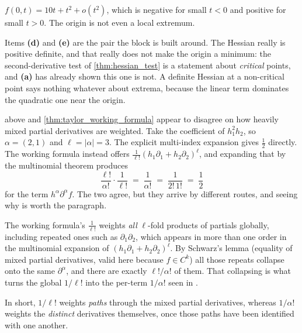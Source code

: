 \begin{example}
\begin{enumerate}[label=\textbf{(\alph*)}]
    $f(0,t) = 10t + t^2 + o(t^2)$, which is negative for small $t < 0$ and positive for small
    $t > 0$. The origin is not even a local extremum.
\end{enumerate}
Items \textbf{(d)} and \textbf{(e)} are the pair the block is built around. The Hessian really is
positive definite, and that really does not make the origin a minimum: the second-derivative test
of \cref{thm:hessian_test} is a statement about \emph{critical} points, and \textbf{(a)} has
already shown this one is not. A definite Hessian at a non-critical point says nothing whatever
about extrema, because the linear term dominates the quadratic one near the origin.
\end{example}

\begin{remark}
 above and \cref{thm:taylor_working_formula} appear to disagree
on how heavily mixed partial derivatives are weighted. Take the coefficient of $h_1^2h_2$, so
$\alpha = (2,1)$ and $\ell = |\alpha| = 3$. The explicit multi-index expansion gives $\tfrac12$
directly. The working formula instead offers $\tfrac{1}{\ell!}(h_1\partial_1+h_2\partial_2)^\ell$,
and expanding that by the multinomial theorem produces
\[
  \frac{\ell!}{\alpha!}\cdot\frac{1}{\ell!} \;=\; \frac{1}{\alpha!}
  \;=\; \frac{1}{2!\,1!} \;=\; \frac12
\]
for the term $h^\alpha\partial^\alpha f$. The two agree, but they arrive by different routes, and
seeing why is worth the paragraph.

The working formula's $\tfrac{1}{\ell!}$ weights \emph{all} $\ell$-fold products of partials
globally, including repeated ones such as $\partial_1\partial_2$, which appears in more than one
order in the multinomial expansion of $(h_1\partial_1+h_2\partial_2)^\ell$. By Schwarz's lemma
(equality of mixed partial derivatives, valid here because $f \in C^k$) all those repeats collapse
onto the same $\partial^\alpha$, and there are exactly $\ell!/\alpha!$ of them. That collapsing is
what turns the global $1/\ell!$ into the per-term $1/\alpha!$ seen in
.

In short, $1/\ell!$ weights \emph{paths} through the mixed partial derivatives, whereas
$1/\alpha!$ weights the \emph{distinct} derivatives themselves, once those paths have been
identified with one another.
\end{remark}

